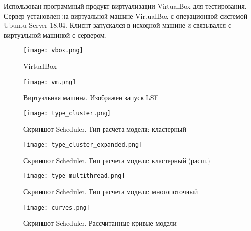 Использован программный продукт виртуализации VirtualBox для тестирования. Сервер установлен на виртуальной машине VirtualBox с операционной системой Ubuntu Server 18.04. Клиент запускался в исходной машине и связывался с виртуальной машиной с сервером.

\begin{figure}[h]
    \centering
    \texttt{[image: vbox.png]}
    \caption{VirtualBox}
\end{figure}

\begin{figure}[h]
    \centering
    \texttt{[image: vm.png]}
    \caption{Виртуальная машина. Изображен запуск LSF}
\end{figure}

\begin{figure}[h]
    \centering
    \texttt{[image: type\_cluster.png]}
    \caption{Скриншот Scheduler. Тип расчета модели: кластерный}
\end{figure}

\begin{figure}[h]
    \centering
    \texttt{[image: type\_cluster\_expanded.png]}
    \caption{Скриншот Scheduler. Тип расчета модели: кластерный (расш.)}
\end{figure}

\begin{figure}[h]
    \centering
    \texttt{[image: type\_multithread.png]}
    \caption{Скриншот Scheduler. Тип расчета модели: многопоточный}
\end{figure}

\begin{figure}[h]
    \centering
    \texttt{[image: curves.png]}
    \caption{Скриншот Scheduler. Рассчитанные кривые модели}
\end{figure}

\clearpage